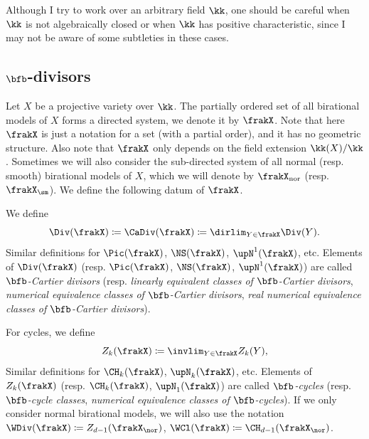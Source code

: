  \begin{remark}
    Although I try to work over an arbitrary field $\kk$, 
    one should be careful when $\kk$ is not algebraically closed or when $\kk$ has positive characteristic, since I may not be aware of some subtleties in these cases.
     \Yang{}
  \end{remark}





\subsection[b-divisors]{$\bfb$-divisors}

  Let $X$ be a projective variety over $\kk$.
  The partially ordered set of all birational models of $X$ forms a directed system, we denote it by $\frakX$.
  Note that here $\frakX$ is just a notation for a set (with a partial order), and it has no geometric structure.
  Also note that $\frakX$ only depends on the field extension $\kk(X)/\kk$.
  Sometimes we will also consider the sub-directed system of all normal (resp. smooth) birational models of $X$, which we will denote by $\frakX_{\mathrm{nor}}$ (resp. $\frakX_{\sm}$).
  We define the following datum of $\frakX$.

  \begin{definition}
    We define 
    \[ \Div(\frakX) \coloneqq \CaDiv(\frakX) \coloneqq \dirlim_{Y \in \frakX} \Div(Y). \]
    Similar definitions for $\Pic(\frakX)$, $\NS(\frakX)$, $\upN^1(\frakX)$, etc.
    Elements of $\Div(\frakX)$ (resp. $\Pic(\frakX)$, $\NS(\frakX)$, $\upN^1(\frakX)$) are called \emph{$\bfb$-Cartier divisors} (resp. \emph{linearly equivalent classes of $\bfb$-Cartier divisors}, \emph{numerical equivalence classes of $\bfb$-Cartier divisors}, \emph{real numerical equivalence classes of $\bfb$-Cartier divisors}).

    For cycles, we define
    \[ Z_{k}(\frakX) \coloneqq \invlim_{Y \in \frakX} Z_{k}(Y), \]
    Similar definitions for $\CH_{k}(\frakX)$, $\upN_k(\frakX)$, etc.
    Elements of $Z_{k}(\frakX)$ (resp. $\CH_{k}(\frakX)$, $\upN_1(\frakX)$) are called \emph{$\bfb$-cycles} (resp. \emph{$\bfb$-cycle classes}, \emph{numerical equivalence classes of $\bfb$-cycles}).
    If we only consider normal birational models, we will also use the notation $\WDiv(\frakX) \coloneqq Z_{d-1}(\frakX_\nor)$, $\WCl(\frakX) \coloneqq \CH_{d-1}(\frakX_\nor)$.
  \end{definition}

